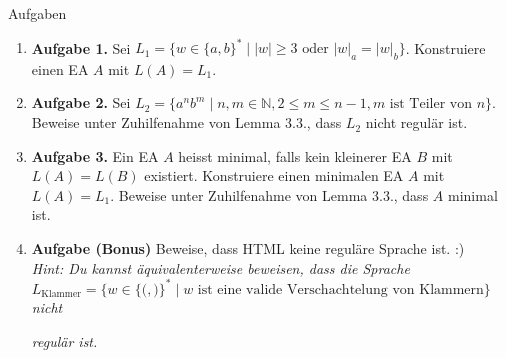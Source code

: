 \documentclass[11pt,aspectratio=169]{beamer}
\begin{document}
\begin{frame}{Aufgaben}

    \begin{enumerate}
        \justifying
        \item \textbf{Aufgabe 1.}
            Sei \(L_1 = \{w \in \{ a, b \}^* \mid |w| \ge 3 \text{ oder } |w|_a = |w|_b\}\).
            Konstruiere einen EA \(A\) mit \(L(A) = L_1\).

        \item \textbf{Aufgabe 2.}
            Sei \(L_2 = \{a^nb^m \mid n, m \in \mathbb N, 2 \le m \le n - 1, m \text{ ist Teiler von } n\}\).
            Beweise unter Zuhilfenahme von Lemma 3.3., dass \(L_2\) nicht regulär ist.

        \item \textbf{Aufgabe 3.}
            Ein EA \(A\) heisst minimal, falls kein kleinerer EA \(B\)
            mit \(L(A) = L(B)\) existiert.
            Konstruiere einen minimalen EA \(A\) mit \(L(A) = L_1\).
            Beweise unter Zuhilfenahme von Lemma 3.3., dass \(A\) minimal ist.

        \item \textbf{Aufgabe (Bonus)}
            Beweise, dass HTML keine reguläre Sprache ist. :) \\
            \vspace{0.5em}
            \textit{Hint: Du kannst äquivalenterweise beweisen, dass die Sprache} \(L_{\text{Klammer}} = \{ w \in \{ \boxed(, \boxed) \}^* \mid w \text{ ist eine valide Verschachtelung von Klammern}\}\) \textit{nicht}

            \textit{regulär ist.}
    \end{enumerate}
\end{frame}
\end{document}
